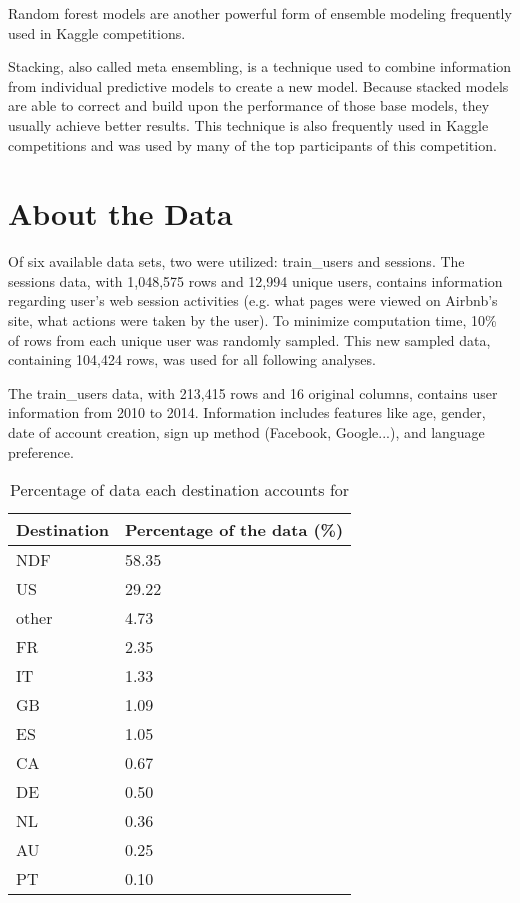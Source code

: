 \documentclass{article}
\begin{document}
Random forest models are another powerful form of ensemble modeling frequently used in Kaggle competitions. 

Stacking, also called meta ensembling, is a technique used to combine information from individual predictive models to create a new model. Because stacked models are able to correct and build upon the performance of those base models, they usually achieve better results. This technique is also frequently used in Kaggle competitions and was used by many of the top participants of this competition. 


\section{About the Data}

Of six available data sets, two were utilized: train\_users and sessions. The sessions data, with 1,048,575 rows and 12,994 unique users, contains information regarding user's web session activities (e.g. what pages were viewed on Airbnb's site, what actions were taken by the user). To minimize computation time, 10\% of rows from each unique user was randomly sampled. This new sampled data, containing 104,424 rows, was used for all following analyses. 

The train\_users data, with 213,415 rows and 16 original columns, contains user information from 2010 to 2014. Information includes features like age, gender, date of account creation, sign up method (Facebook, Google...), and language preference. 

\begin{table}[ht]
\centering
\begin{tabular}{| l |l |}
  \hline
  \textbf{Destination} & \textbf{Percentage of the data (\%)} \\ 
  \hline
  NDF & 58.35 \\ 
  US & 29.22 \\ 
  other & 4.73 \\ 
  FR & 2.35 \\ 
  IT & 1.33 \\ 
  GB & 1.09 \\ 
  ES & 1.05 \\ 
  CA & 0.67 \\ 
  DE & 0.50 \\ 
  NL & 0.36 \\ 
  AU & 0.25 \\ 
  PT & 0.10 \\ 
   \hline
\end{tabular}
\caption{Percentage of data each destination accounts for}
\label{table:countries}
\end{table}
\end{document}
